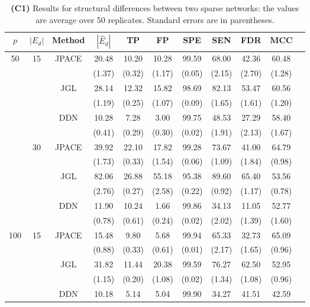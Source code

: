 \documentclass[useAMS,usenatbib,referee]{bio}
\begin{document}
{{\begin{table}[htb!]
\caption{{\bf (C1)} Results for structural differences between two sparse
networks: the values are average over 50 replicates.
Standard errors are in parentheses.
}
\medskip
\centering
{ %
\begin{tabular}{||c|c|c||c|c|c|c|c|c|c||c} \cline{1-10}
$p$  &  $|E_d|$  & Method & $|\hat{E}_d|$ & TP & FP & SPE & SEN & FDR & MCC \\ \hline 
\multirow{12}{*}{50}  &\multirow{6}{*}{15}  & \multirow{2}{*}{JPACE} &20.48 & 10.20 & 10.28 & 99.59 & 68.00 & 42.36 & 60.48 \\ 
& & & (1.37) & (0.32) & (1.17) & (0.05) & (2.15) & (2.70) & (1.28) \\ \cline{3-10} 
& & \multirow{2}{*}{JGL} & 28.14 & 12.32 & 15.82 & 98.69 & 82.13 & 53.47 & 60.56 \\ 
 & & & (1.19) & (0.25) & (1.07) & (0.09) & (1.65) & (1.61) & (1.20) \\ \cline{3-10} 
& & \multirow{2}{*}{DDN} & 10.28 & 7.28 & 3.00 & 99.75 & 48.53 & 27.29 & 58.40 \\ 
 & & & (0.41) & (0.29) & (0.30) & (0.02) & (1.91) & (2.13) & (1.67) \\\cline{2-10} 
  &\multirow{6}{*}{30}  & \multirow{2}{*}{JPACE} &39.92 & 22.10 & 17.82 & 99.28 & 73.67 & 41.00 & 64.79 \\ 
& & & (1.73) & (0.33) & (1.54) & (0.06) & (1.09) & (1.84) & (0.98) \\ \cline{3-10} 
& & \multirow{2}{*}{JGL} & 82.06 & 26.88 & 55.18 & 95.38 & 89.60 & 65.40 & 53.56 \\ 
 & & & (2.76) & (0.27) & (2.58) & (0.22) & (0.92) & (1.17) & (0.78) \\ \cline{3-10} 
& & \multirow{2}{*}{DDN} & 11.90 & 10.24 & 1.66 & 99.86 & 34.13 & 11.05 & 52.77 \\ 
 & & & (0.78) & (0.61) & (0.24) & (0.02) & (2.02) & (1.39) & (1.60) \\\cline{1-10} 
\multirow{12}{*}{100}  &\multirow{6}{*}{15}  & \multirow{2}{*}{JPACE} &15.48 & 9.80 & 5.68 & 99.94 & 65.33 & 32.73 & 65.09 \\ 
& & & (0.88) & (0.33) & (0.61) & (0.01) & (2.17) & (1.65) & (0.96) \\ \cline{3-10} 
& & \multirow{2}{*}{JGL} & 31.82 & 11.44 & 20.38 & 99.59 & 76.27 & 62.50 & 52.95 \\ 
 & & & (1.15) & (0.20) & (1.08) & (0.02) & (1.34) & (1.08) & (0.96) \\ \cline{3-10} 
& & \multirow{2}{*}{DDN} & 10.18 & 5.14 & 5.04 & 99.90 & 34.27 & 41.51 & 42.59 \\ 

\end{tabular}}
\end{table}}}
\end{document}
